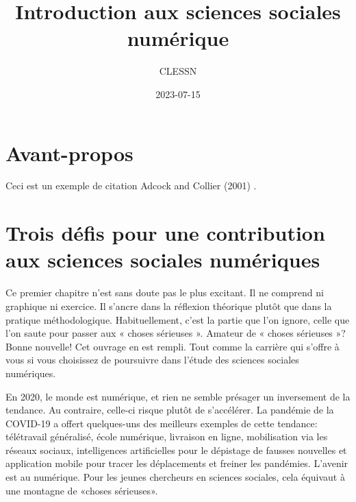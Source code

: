 \documentclass[
  letterpaper,
  DIV=11,
  numbers=noendperiod]{scrreprt}
\title{Introduction aux sciences sociales numérique}
\author{CLESSN}
\date{2023-07-15}
\renewcommand*\contentsname{Table of contents}
\newcommand\contentsname{Table of contents}
\begin{document}
\maketitle
\ifdefined\Shaded\renewenvironment{Shaded}{\begin{tcolorbox}[frame hidden, enhanced, breakable, sharp corners, boxrule=0pt, interior hidden, borderline west={3pt}{0pt}{shadecolor}]}{\end{tcolorbox}}\fi

\renewcommand*\contentsname{Table of contents}
{
\hypersetup{linkcolor=}
\setcounter{tocdepth}{2}
\tableofcontents
}

\hypertarget{avant-propos}{%
\chapter*{Avant-propos}\label{avant-propos}}


Ceci est un exemple de citation Adcock and Collier (2001) .


\hypertarget{trois-duxe9fis-pour-une-contribution-aux-sciences-sociales-numuxe9riques}{%
\chapter{Trois défis pour une contribution aux sciences sociales
numériques}\label{trois-duxe9fis-pour-une-contribution-aux-sciences-sociales-numuxe9riques}}

Ce premier chapitre n'est sans doute pas le plus excitant. Il ne
comprend ni graphique ni exercice. Il s'ancre dans la réflexion
théorique plutôt que dans la pratique méthodologique. Habituellement,
c'est la partie que l'on ignore, celle que l'on saute pour passer aux «
choses sérieuses ». Amateur de « choses sérieuses »? Bonne nouvelle! Cet
ouvrage en est rempli. Tout comme la carrière qui s'offre à vous si vous
choisissez de poursuivre dans l'étude des sciences sociales numériques.

En 2020, le monde est numérique, et rien ne semble présager un
inversement de la tendance. Au contraire, celle-ci risque plutôt de
s'accélérer. La pandémie de la COVID-19 a offert quelques-uns des
meilleurs exemples de cette tendance: télétravail généralisé, école
numérique, livraison en ligne, mobilisation via les réseaux sociaux,
intelligences artificielles pour le dépistage de fausses nouvelles et
application mobile pour tracer les déplacements et freiner les
pandémies. L'avenir est au numérique. Pour les jeunes chercheurs en
sciences sociales, cela équivaut à une montagne de «choses sérieuses».
\end{document}
